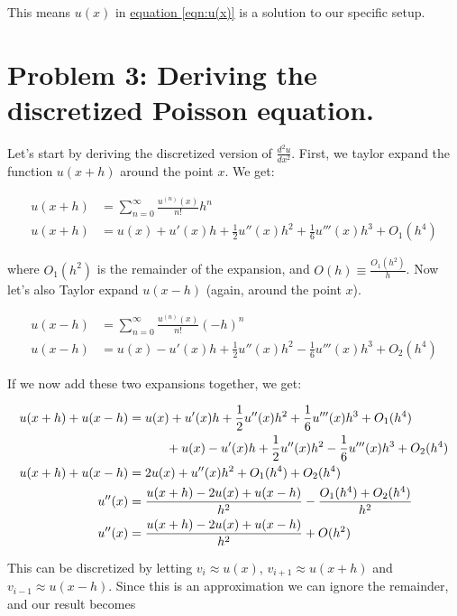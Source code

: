 \documentclass[english,notitlepage]{article}  %
\begin{document}
  This means $u(x)$ in \hyperref[eqn:u(x)]{equation \ref*{eqn:u(x)}}
   is a solution to our specific setup.




\section*{Problem 3: Deriving the discretized Poisson equation.}

    Let's start by deriving the discretized version of $\frac{d^2u}{dx^2}$. First,
    we taylor expand the function $u(x+h)$ around the point $x$. We get:

    \begin{align*}
        u(x+h) &= \sum_{n=0}^{\infty} \frac{u^{(n)}(x)}{n!} h^n
        \\
        u(x+h) &= u(x) + u'(x) h + \frac{1}{2} u''(x) h^2 + \frac{1}{6} u'''(x) h^3 + O_1(h^4)
    \end{align*}

    where $O_1(h^2)$ is the remainder of the expansion, and $O(h) \equiv
    \frac{O_1(h^2)}{h}$. Now let's also Taylor expand $u(x-h)$ (again, around the
    point $x$).

    \begin{align*}
        u(x-h) &= \sum_{n=0}^{\infty} \frac{u^{(n)}(x)}{n!} (-h)^n
        \\
        u(x-h) &= u(x) - u'(x) h + \frac{1}{2} u''(x) h^2 - \frac{1}{6} u'''(x) h^3 + O_2(h^4)
    \end{align*}

    If we now add these two expansions together, we get:

    \begin{align*}
        u(x+h) + u(x-h) &= u(x) + u'(x) h + \frac{1}{2} u''(x) h^2 + \frac{1}{6} u'''(x) h^3
        + O_1(h^4)
        \\ & \hspace*{30pt} + u(x) - u'(x) h + \frac{1}{2} u''(x) h^2 - \frac{1}{6} u'''(x) h^3 + O_2(h^4)
        \\
        u(x+h) + u(x-h) &= 2u(x) + u''(x) h^2 + O_1(h^4) + O_2(h^4)
        \\
        u''(x) &= \frac{u(x+h) - 2u(x) + u(x-h)}{h^2} - \frac{O_1(h^4) + O_2(h^4)}{h^2}
        \\
        u''(x) &= \frac{u(x+h) - 2u(x) + u(x-h)}{h^2} + O(h^2)
    \end{align*}

    This can be discretized by letting $v_i \approx u(x)$, $v_{i+1} \approx u(x+h)$
    and $v_{i-1} \approx u(x-h)$. Since this is an approximation we can ignore the
    remainder, and our result becomes
\end{document}
